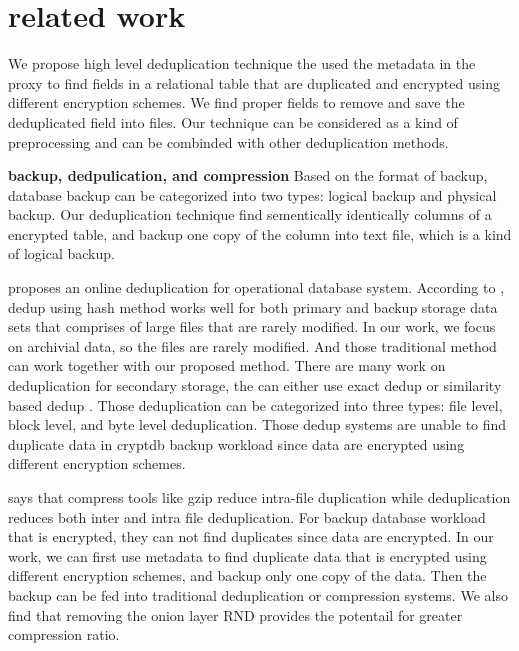 \section{related work}

We propose high level deduplication technique the used the metadata in the proxy to find fields in a relational table that are duplicated and encrypted using different encryption schemes. We find proper fields to remove and save the deduplicated field into files. Our technique can be considered as a kind of preprocessing and can be combinded with other deduplication methods.


\textbf{backup, dedpulication, and compression} Based on the format of backup, database backup can be categorized into two types: logical backup and physical backup\citep{mysqlbackup}. Our deduplication technique find sementically identically columns of a encrypted table, and backup one copy of the column into text file, which is a kind of logical backup. 



\citep{xu2017online} proposes an online deduplication for operational database system. According to \citep{xu2017online}, dedup using hash method works well for both primary and backup storage data sets that comprises of large files that are rarely modified. In our work, we focus on archivial data, so the files are rarely modified. And those traditional method can work together with our proposed method. There are many work on deduplication for secondary storage, the can either use exact dedup\citep{dubnicki2009hydrastor} or similarity based dedup\citep{xu2015reducing} \citep{aronovich2009design}\citep{you2005deep}. Those deduplication can be categorized into three types: file level, block level, and byte level deduplication. Those dedup systems are unable to find duplicate data in cryptdb backup workload since data are encrypted using different encryption schemes.



\citep{mandagere2008demystifying} says that compress tools like gzip reduce intra-file duplication while deduplication reduces both inter and intra file deduplication. For backup database workload that is encrypted, they can not find duplicates since data are encrypted. In our work, we can first use metadata to find duplicate data that is encrypted using different encryption schemes, and backup only one copy of the data. Then the backup can be fed into traditional deduplication or compression systems. We also find that removing the onion layer RND provides the potentail for greater compression ratio. 


